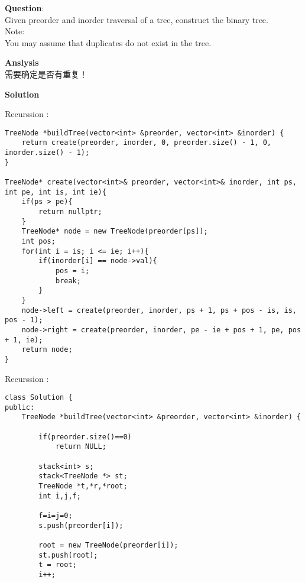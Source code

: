     
\begin{description}
    \item{\textbf{Question}}:\\%
		Given preorder and inorder traversal of a tree, construct the binary tree.\\
		Note:\\
		You may assume that duplicates do not exist in the tree.\\

    \item{\textbf{Anslysis}}\\
		需要确定是否有重复！\\

    \item{\textbf{Solution}}\\
	\item{Recurssion} : \\
		\begin{lstlisting}
TreeNode *buildTree(vector<int> &preorder, vector<int> &inorder) {
    return create(preorder, inorder, 0, preorder.size() - 1, 0, inorder.size() - 1);
}

TreeNode* create(vector<int>& preorder, vector<int>& inorder, int ps, int pe, int is, int ie){
    if(ps > pe){
        return nullptr;
    }
    TreeNode* node = new TreeNode(preorder[ps]);
    int pos;
    for(int i = is; i <= ie; i++){
        if(inorder[i] == node->val){
            pos = i;
            break;
        }
    }
    node->left = create(preorder, inorder, ps + 1, ps + pos - is, is, pos - 1);
    node->right = create(preorder, inorder, pe - ie + pos + 1, pe, pos + 1, ie);
    return node;
}
		\end{lstlisting}
	\item{Recurssion} : \\
		\begin{lstlisting}
class Solution {
public:
    TreeNode *buildTree(vector<int> &preorder, vector<int> &inorder) {

        if(preorder.size()==0)
            return NULL;

        stack<int> s;
        stack<TreeNode *> st;
        TreeNode *t,*r,*root;
        int i,j,f;

        f=i=j=0;
        s.push(preorder[i]);

        root = new TreeNode(preorder[i]);
        st.push(root);
        t = root;
        i++;


\end{lstlisting}
\end{description}
